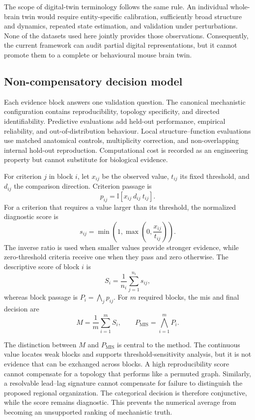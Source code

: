 \documentclass[a4paper,fleqn]{cas-sc}
\begin{document}
The scope of digital-twin terminology follows the same rule. An individual
whole-brain twin would require entity-specific calibration, sufficiently broad
structure and dynamics, repeated state estimation, and validation under
perturbations. None of the datasets used here jointly provides those
observations. Consequently, the current framework can audit partial digital
representations, but it cannot promote them to a complete or behavioural mouse
brain twin.

\subsection{Non-compensatory decision model}
\label{subsec:decision-model}

Each evidence block answers one validation question. The canonical mechanistic
configuration contains reproducibility, topology specificity, and directed
identifiability. Predictive evaluations add held-out performance, empirical
reliability, and out-of-distribution behaviour. Local structure--function
evaluations use matched anatomical controls, multiplicity correction, and
non-overlapping internal hold-out reproduction. Computational cost is recorded as an engineering
property but cannot substitute for biological evidence.

For criterion $j$ in block $i$, let $x_{ij}$ be the observed value, $t_{ij}$
its fixed threshold, and $d_{ij}$ the comparison direction. Criterion passage
is
\[
p_{ij}=\mathbb{I}\!\left[x_{ij}\ d_{ij}\ t_{ij}\right].
\]
For a criterion that requires a value larger than its threshold, the normalized
diagnostic score is
\[
s_{ij}=\min\!\left(1,\max\!\left(0,\frac{x_{ij}}{t_{ij}}\right)\right).
\]
The inverse ratio is used when smaller values provide stronger evidence, while
zero-threshold criteria receive one when they pass and zero otherwise. The
descriptive score of block $i$ is
\[
S_i=\frac{1}{n_i}\sum_{j=1}^{n_i}s_{ij},
\]
whereas block passage is $P_i=\bigwedge_j p_{ij}$. For $m$ required blocks,
the \ac{mis} and final decision are
\[
M=\frac{1}{m}\sum_{i=1}^{m}S_i,
\qquad
P_{\mathrm{MIS}}=\bigwedge_{i=1}^{m}P_i.
\]

The distinction between $M$ and $P_{\mathrm{MIS}}$ is central to the method.
The continuous value locates weak blocks and supports threshold-sensitivity
analysis, but it is not evidence that can be exchanged across blocks. A high
reproducibility score cannot compensate for a topology that performs like a
permuted graph. Similarly, a resolvable lead--lag signature cannot compensate
for failure to distinguish the proposed regional organization. The categorical
decision is therefore conjunctive, while the score remains diagnostic. This
prevents the numerical average from becoming an unsupported ranking of
mechanistic truth.
\end{document}
